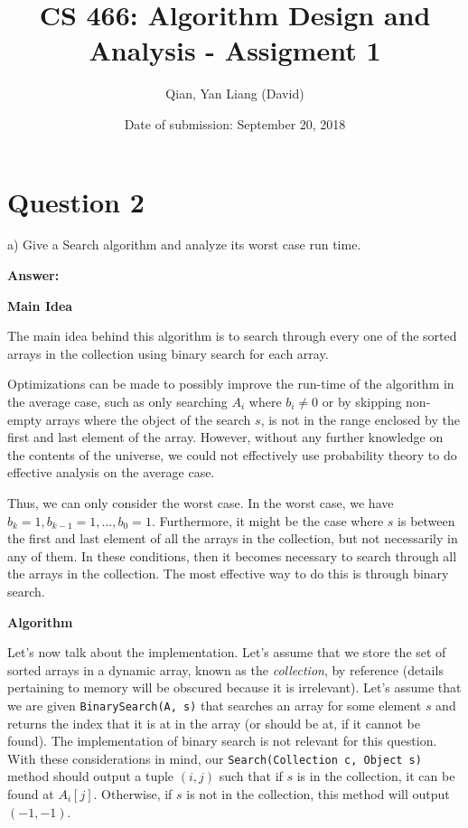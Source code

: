 \documentclass{article}
\title{CS 466: Algorithm Design and Analysis - Assigment 1}
\author{Qian, Yan Liang (David)}
\date{Date of submission: September 20, 2018}
\begin{document}
\newpage

\section{Question 2}

a) Give a Search algorithm and analyze its worst case run time.
\newline

\textbf{Answer:} \newline

\textbf{Main Idea}

The main idea behind this algorithm is to search through every one of the sorted arrays in the collection using
binary search for each array.

Optimizations can be made to possibly improve the run-time of the algorithm in the average case, such as
only searching $A_i$ where $b_i \neq 0$ or by skipping non-empty arrays where the object of the search $s$, is not in
the range enclosed by the first and last element of the array. However, without any further knowledge on the contents
of the universe, we could not effectively use probability theory to do effective analysis on the average case.

Thus, we can only consider the worst case. In the worst case, we have $b_k = 1, b_{k-1} = 1, \ldots, b_0 = 1$. Furthermore,
it might be the case where $s$ is between the first and last element of all the arrays in the collection,
but not necessarily in any of them. In these conditions, then it becomes necessary to search through all the arrays
in the collection. The most effective way to do this is through binary search.
\newline

\textbf{Algorithm}

Let's now talk about the implementation. Let's assume that we store the set of sorted arrays in a dynamic
array, known as the \textit{collection}, by reference (details pertaining to memory will be obscured because
it is irrelevant). Let's assume that we are given \texttt{BinarySearch(A, s)} that searches an array for some element
$s$ and returns the index that it is at in the array (or should be at, if it cannot be found).
The implementation of binary search is not relevant for this question. With these considerations in mind, our
\texttt{Search(Collection c, Object s)} method should output a tuple $(i, j)$ such that if $s$ is in the collection,
it can be found at $A_{i}[j]$. Otherwise, if $s$ is not in the collection, this method will output $(-1, -1)$.
\end{document}
